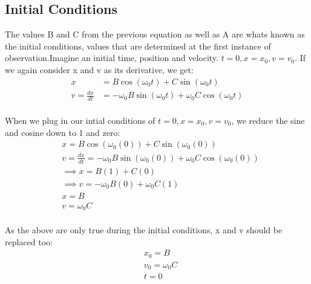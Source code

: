 \documentclass[10pt]{report}
\begin{document}
{\subsection{Initial Conditions}
\par{The values B and C from the previous equation as well as A are whats known as the initial conditions, values that are determined at the first instance of observation.Imagine an initial time, position and velocity. $t=0, x=x_{0}, v=v_{0}$. If we again consider x and v as its derivative, we get: }
\begin{align*}
	x&=B\cos\left(\omega_{0}t\right)+C\sin\left(\omega_{0}t\right) \\
	v=\frac{dx}{dt}&=-\omega_{0}B\sin\left(\omega_{0}t\right)+\omega_{0}C\cos\left(\omega_{0}t\right) \\
\end{align*}
\par{When we plug in our intial conditions of $t=0, x=x_{0}, v=v_{0}$, we reduce the sine and cosine down to 1 and zero: }
\begin{align*}
	& x=B\cos\left(\omega_{0}\left(0\right)\right)+C\sin\left(\omega_{0}\left(0\right)\right) \\
	& v=\frac{dx}{dt}=-\omega_{0}B\sin\left(\omega_{0}\left(0\right)\right)+\omega_{0}C\cos\left(\omega_{0}\left(0\right)\right) \\
	& \implies x=B\left(1\right)+C\left(0\right) \\
    & \implies v=-\omega_{0}B\left(0\right)+\omega_{0}C\left(1\right) \\
	& x=B \\
	& v=\omega_{0}C \\
\end{align*}
\par{As the above are only true during the initial conditions, x and v should be replaced too: }
\begin{align*}
	& x_{0}=B \\
	& v_{0}=\omega_{0}C \\
	& t=0
\end{align*}
}
\end{document}
